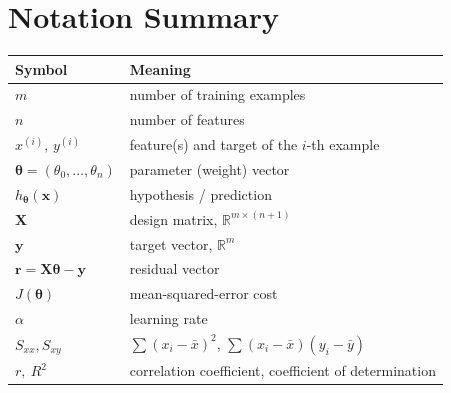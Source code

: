 \documentclass[11pt,a4paper]{report}
\theoremstyle{definition}
\theoremstyle{plain}
\theoremstyle{remark}
\newcommand{\R}{\mathbb{R}}
\newcommand{\vx}{\mathbf{x}}
\newcommand{\vy}{\mathbf{y}}
\newcommand{\vw}{\bm{\theta}}          %
\newcommand{\Xmat}{\mathbf{X}}
\newcommand{\xbar}{\bar{x}}
\newcommand{\ybar}{\bar{y}}
\newcommand{\htheta}{h_{\bm{\theta}}}
\begin{document}
	\appendix
	\chapter{Notation Summary}
	\begin{center}
		\begin{tabular}{@{}ll@{}}
			\toprule
			Symbol & Meaning\\
			\midrule
			$m$ & number of training examples\\
			$n$ & number of features\\
			$x^{(i)},\,y^{(i)}$ & feature(s) and target of the $i$-th example\\
			$\vw=(\theta_0,\dots,\theta_n)$ & parameter (weight) vector\\
			$\htheta(\vx)$ & hypothesis / prediction\\
			$\Xmat$ & design matrix, $\R^{m\times(n+1)}$\\
			$\vy$ & target vector, $\R^{m}$\\
			$\mathbf{r}=\Xmat\vw-\vy$ & residual vector\\
			$J(\vw)$ & mean-squared-error cost\\
			$\alpha$ & learning rate\\
			$S_{xx},S_{xy}$ & $\sum(x_i-\xbar)^2$, $\sum(x_i-\xbar)(y_i-\ybar)$\\
			$r,\ R^2$ & correlation coefficient, coefficient of determination\\
			\bottomrule
		\end{tabular}
	\end{center}
	
\end{document}
